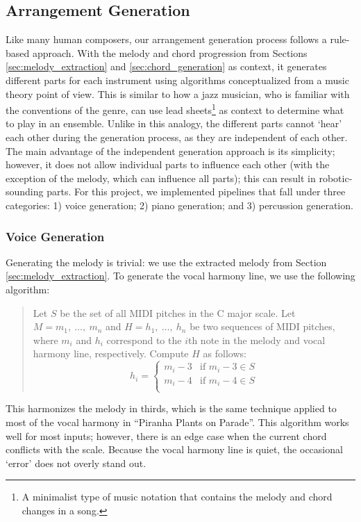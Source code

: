 \subsection{Arrangement Generation}
\label{sec:arrangement_generation}

Like many human composers, our arrangement generation process follows a rule-based approach. With the melody and chord progression from Sections \ref{sec:melody_extraction} and \ref{sec:chord_generation} as context, it generates different parts for each instrument using algorithms conceptualized from a music theory point of view. This is similar to how a jazz musician, who is familiar with the conventions of the genre, can use lead sheets\footnote{A minimalist type of music notation that contains the melody and chord changes in a song.} as context to determine what to play in an ensemble. Unlike in this analogy, the different parts cannot `hear' each other during the generation process, as they are independent of each other. The main advantage of the independent generation approach is its simplicity; however, it does not allow individual parts to influence each other (with the exception of the melody, which can influence all parts); this can result in robotic-sounding parts. For this project, we implemented pipelines that fall under three categories: 1) voice generation; 2) piano generation; and 3) percussion generation.

\subsubsection{Voice Generation}

Generating the melody is trivial: we use the extracted melody from Section \ref{sec:melody_extraction}. To generate the vocal harmony line, we use the following algorithm:
\begin{quote}
    Let $S$ be the set of all MIDI pitches in the C major scale.
    Let $M = m_1, \ \ldots, \ m_n$ and $H = h_1, \ \ldots, \ h_n$ be two sequences of MIDI pitches, where $m_i$ and $h_i$ correspond to the $i$th note in the melody and vocal harmony line, respectively.
    Compute $H$ as follows:
    $$h_i = \begin{cases}
        m_i - 3 & \text{if }m_i - 3 \in S \\
        m_i - 4 & \text{if }m_i - 4 \in S \\
    \end{cases}$$
\end{quote}
This harmonizes the melody in thirds, which is the same technique applied to most of the vocal harmony in ``Piranha Plants on Parade''. This algorithm works well for most inputs; however, there is an edge case when the current chord conflicts with the scale. Because the vocal harmony line is quiet, the occasional `error' does not overly stand out.

